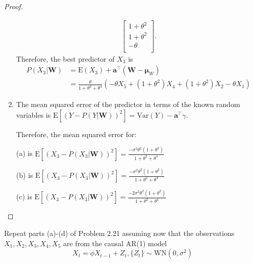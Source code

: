 \documentclass[12pt]{article}
\theoremstyle{definition}
\newenvironment{custompbm}[1]
  {\renewcommand\theproblem{#1}\problem}
  {\endproblem}
\newcommand{\E}{\text{E}}
\newcommand{\V}{\text{Var}}
\newcommand{\vect}[1]{\boldsymbol{#1}}
\begin{document}
\begin{proof}
\begin{enumerate}
\begin{align*}
\begin{bmatrix}
          1 + \theta^2 \\
          1 + \theta^2 \\
          -\theta \\
        \end{bmatrix}.
      \end{align*}
      Therefore, the best predictor of $X_3$ is
      \begin{align*}
        P(X_3|\vect{W}) &= \E(X_3) + \vect{a}^\intercal (\vect{W} - \vect{\mu}_W) \\
        &= \frac{\theta}{1 + \theta^2 + \theta^4} (- \theta  X_5 + (1 + \theta^2) X_4 + (1 + \theta^2) X_2 -\theta X_1)
      \end{align*}

    \item The mean squared error of the predictor in terms of the known random
      variables is $\E\left[ (Y - P(Y|\vect{W}))^2 \right] = \V(Y) - \vect{a}^\intercal \gamma$.

      Therefore, the mean squared error for:

      (a) is $\E\left[ (X_3 - P(X_3|\vect{W}))^2 \right] =
      \frac{-\sigma^2\theta^2(1 + \theta^2)}{1 + \theta^2 + \theta^4}$

      (b) is $\E\left[ (X_3 - P(X_3|\vect{W}))^2 \right] =
      \frac{-\sigma^2\theta^2(1 + \theta^2)}{1 + \theta^2 + \theta^4}$

      (c) is $\E\left[ (X_3 - P(X_3|\vect{W}))^2 \right] =
      \frac{-2\sigma^2\theta^2(1 + \theta^2)}{1 + \theta^2 + \theta^4}$
  \end{enumerate}
\end{proof}


\begin{custompbm}{2.22}
  Repeat parts (a)-(d) of Problem 2.21 assuming now that the observations
  $X_1, X_2, X_3, X_4, X_5$ are from the causal AR(1) model
  \[
    X_t = \phi X_{t-1} + Z_t, \{Z_t\} \sim \text{WN}(0, \sigma^2)
  \]
\end{custompbm}
\end{document}
